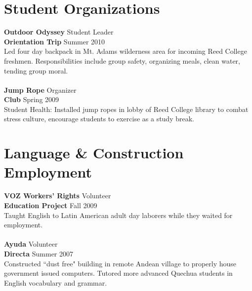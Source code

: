 \documentclass[margin,line]{resume}
\begin{document}
\begin{resume}
\section{\mysidestyle Student Organizations }
\textbf{Outdoor Odyssey} \hfill Student Leader \\
\textbf{Orientation Trip} \hfill Summer 2010 \\
Led four day backpack in Mt. Adams wilderness area for incoming Reed College freshmen. Responsibilities include group safety, organizing meals, clean water, tending group moral.
\\\vspace{-2mm}\\
\textbf{Jump Rope} \hfill Organizer
\\\textbf{Club}  \hfill Spring 2009\\
Student Health: Installed jump ropes in lobby of Reed College library to combat stress culture, encourage students to exercise as a study break. 



	\section{\mysidestyle Language \& Construction \\ Employment}
\textbf{VOZ Workers' Rights}  \hfill Volunteer \\ \textbf{Education Project} \hfill Fall 2009 \\ Taught English to Latin American adult day laborers while they waited for employment. \\
\vspace{-2mm}\\    
\textbf{Ayuda} \hfill Volunteer \\    
\textbf{Directa} \hfill Summer 2007	\\
Constructed ``dust free" building in remote Andean village to properly house government issued computers. Tutored more advanced Quechua students in English vocabulary and grammar.    
    

\end{resume}
\end{document}
